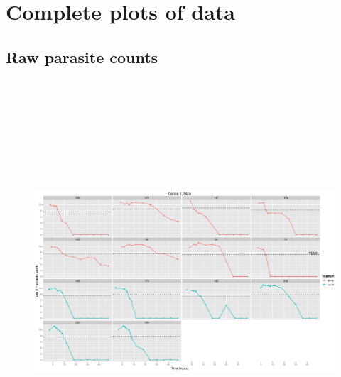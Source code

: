 \chapter{Complete plots of data}
\section{Raw parasite counts}
\begin{figure}
\includegraphics[height=150mm]{Araw1M.eps}
\end{figure}
